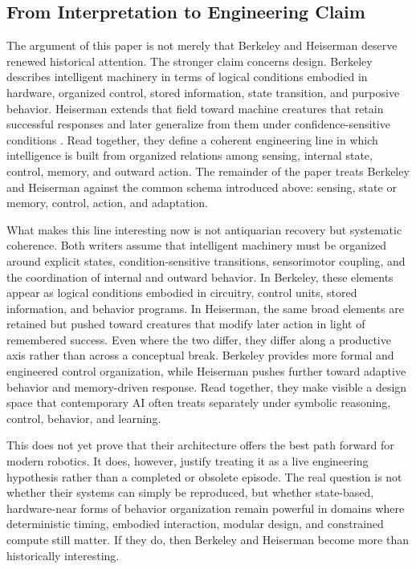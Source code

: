 \documentclass[11pt]{article}
\begin{document}
\subsection*{From Interpretation to Engineering Claim}

The argument of this paper is not merely that Berkeley and Heiserman deserve renewed historical attention. The stronger claim concerns design. Berkeley describes intelligent machinery in terms of logical conditions embodied in hardware, organized control, stored information, state transition, and purposive behavior. Heiserman extends that field toward machine creatures that retain successful responses and later generalize from them under confidence-sensitive conditions \citep[pp.~18--20]{heiserman1981robot}. Read together, they define a coherent engineering line in which intelligence is built from organized relations among sensing, internal state, control, memory, and outward action. The remainder of the paper treats Berkeley and Heiserman against the common schema introduced above: sensing, state or memory, control, action, and adaptation.

What makes this line interesting now is not antiquarian recovery but systematic coherence. Both writers assume that intelligent machinery must be organized around explicit states, condition-sensitive transitions, sensorimotor coupling, and the coordination of internal and outward behavior. In Berkeley, these elements appear as logical conditions embodied in circuitry, control units, stored information, and behavior programs. In Heiserman, the same broad elements are retained but pushed toward creatures that modify later action in light of remembered success. Even where the two differ, they differ along a productive axis rather than across a conceptual break. Berkeley provides more formal and engineered control organization, while Heiserman pushes further toward adaptive behavior and memory-driven response. Read together, they make visible a design space that contemporary AI often treats separately under symbolic reasoning, control, behavior, and learning.

This does not yet prove that their architecture offers the best path forward for modern robotics. It does, however, justify treating it as a live engineering hypothesis rather than a completed or obsolete episode. The real question is not whether their systems can simply be reproduced, but whether state-based, hardware-near forms of behavior organization remain powerful in domains where deterministic timing, embodied interaction, modular design, and constrained compute still matter. If they do, then Berkeley and Heiserman become more than historically interesting.
\end{document}
